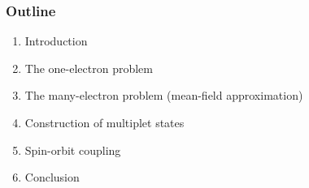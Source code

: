 \begin{frame}[t]
  \frametitle{Outline}
  \begin{enumerate}
    \item Introduction
    \item The one-electron problem
    \item The many-electron problem (mean-field approximation)
    \item Construction of multiplet states
    \item Spin-orbit coupling
    \item Conclusion
  \end{enumerate}
\end{frame}